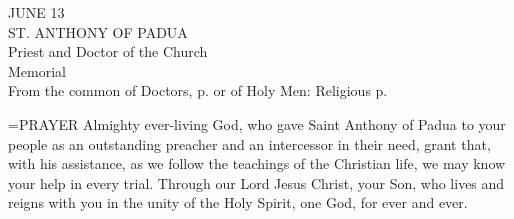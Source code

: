 \begin{center}\normalsize JUNE 13\\
\footnotesize ST. ANTHONY OF PADUA\\
\footnotesize Priest and Doctor of the Church\\
\footnotesize Memorial\\
\footnotesize From the common of Doctors, p.   or of Holy Men: Religious p. \\
\end{center}

\hangindent=\parindent \small{PRAYER 
Almighty ever-living God,
who gave Saint Anthony of Padua to your people
as an outstanding preacher
and an intercessor in their need,
grant that, with his assistance,
as we follow the teachings of the Christian life,
we may know your help in every trial.
Through our Lord Jesus Christ, your Son,
who lives and reigns with you in the unity of the Holy Spirit,
one God, for ever and ever.\\}
 
